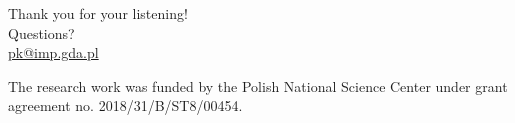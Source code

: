 \documentclass[10pt,aspectratio=169,dvipsnames]{beamer} %
\begin{document}
	\setcounter{subfigure}{0}
	{
		\begin{frame}[standout]
			\centering
			Thank you for your listening!\\ \vspace{12pt}
			Questions?\\ \vspace{12pt}
			\url{pk@imp.gda.pl}
			\par\medskip
			\par\medskip
			\footnotesize
			The research work was funded by the Polish National Science Center under grant agreement no. 2018/31/B/ST8/00454.
		\end{frame}
	}
	\note{}	
\end{document}
